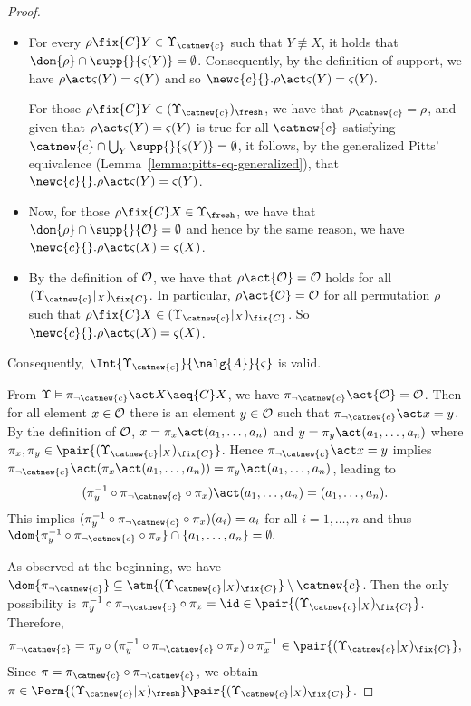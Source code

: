 \begin{proof}
\begin{itemize}
    \item For every $\rho \fix{C} Y \in \Upsilon_{\catnew{c}}$ such that $Y\not\equiv X$, it holds that $\dom{\rho} \cap \supp{}{\varsigma(Y)} = \emptyset$. Consequently, by the definition of support, we have $\rho \act \varsigma(Y) = \varsigma(Y)$ and so $\newc{c}{}. \rho \act \varsigma(Y) = \varsigma(Y).$

    For  those $\rho\fix{C} Y\in (\Upsilon_{\catnew{c}})_{\fresh}$, we have that $\rho_{\catnew{c}} = \rho$, and given that $\rho \act \varsigma(Y) = \varsigma(Y)$ is true for all $\catnew{c}$ satisfying $\catnew{c} \cap \bigcup_{Y} \supp{}{\varsigma(Y)} = \emptyset$, it follows, by the generalized Pitts' equivalence (Lemma~\ref{lemma:pitts-eq-generalized}), that $\newc{c}{}.\rho \act \varsigma(Y) = \varsigma(Y)$.

    \item Now, for those $\rho\fix{C} X\in \Upsilon_{\fresh}$, we have that $\dom{\rho}\cap \supp{}{\cal O} = \emptyset$ and hence by the same reason, we have $\newc{c}{}.\rho\act \varsigma(X) = \varsigma(X)$.

    \item By the definition of ${\cal O}$, we have that $\rho \act {\cal O} = {\cal O}$ holds for all $(\Upsilon_{\catnew{c}}|_X)_{\fix{C}}$. In particular, $\rho \act {\cal O} = {\cal O}$ for all permutation $\rho$ such that $\rho\fix{C} X\in (\Upsilon_{\catnew{c}}|_X)_{\fix{C}}$. So $\newc{c}{}.\rho\act \varsigma(X) = \varsigma(X)$.
\end{itemize}

Consequently, $\Int{\Upsilon_{\catnew{c}}}{\nalg{A}}{\varsigma}$ is valid.

From $\Upsilon \vDash \pi_{\neg\catnew{c}}\act X \aeq{C} X$, we have $\pi_{\neg\catnew{c}}\act {\cal O} = {\cal O}$. Then for all element $x\in{\cal O}$ there is an element $y\in{\cal O}$ such that $\pi_{\neg\catnew{c}}\act x = y$. By the definition of ${\cal O}$, $x = \pi_x\act (a_1,\ldots,a_n)$ and $y = \pi_y\act (a_1,\ldots,a_n)$ where $\pi_x,\pi_y\in \pair{(\Upsilon_{\catnew{c}}|_X)_{\fix{C}}}$. Hence $ \pi_{\neg\catnew{c}}\act x = y$ implies $\pi_{\neg\catnew{c}}\act (\pi_x\act (a_1,\ldots,a_n)) = \pi_y\act (a_1,\ldots,a_n)$, leading to
\[
    (\pi_y^{-1}\circ\pi_{\neg\catnew{c}}\circ\pi_x)\act (a_1,\ldots,a_n) = (a_1,\ldots,a_n).
\]
This implies $(\pi_y^{-1}\circ\pi_{\neg\catnew{c}}\circ\pi_x)(a_i) = a_i$ for all $i=1,\ldots,n$ and thus $\dom{\pi_y^{-1}\circ\pi_{\neg\catnew{c}}\circ\pi_x}\cap\{a_1,\ldots,a_n\} = \emptyset.$

As observed at the beginning, we have $\dom{\pi_{\neg\catnew{c}}}\subseteq \atm{(\Upsilon_{\catnew{c}}|_X)_{\fix{C}}}\setminus\catnew{c}$. Then the only possibility is $\pi_y^{-1}\circ\pi_{\neg\catnew{c}}\circ\pi_x = \id\in \pair{(\Upsilon_{\catnew{c}}|_X)_{\fix{C}}}$. Therefore,
\[
    \pi_{\neg\catnew{c}} = \pi_y\circ(\pi_y^{-1}\circ\pi_{\neg\catnew{c}}\circ\pi_x)\circ \pi_x^{-1} \in \pair{(\Upsilon_{\catnew{c}}|_X)_{\fix{C}}},
\]
Since $\pi = \pi_{\catnew{c}}\circ\pi_{\neg\catnew{c}}$, we obtain $\pi\in \Perm{(\Upsilon_{\catnew{c}}|_X)_{\fresh}}\pair{(\Upsilon_{\catnew{c}}|_X)_{\fix{C}}}$.
\end{proof}

